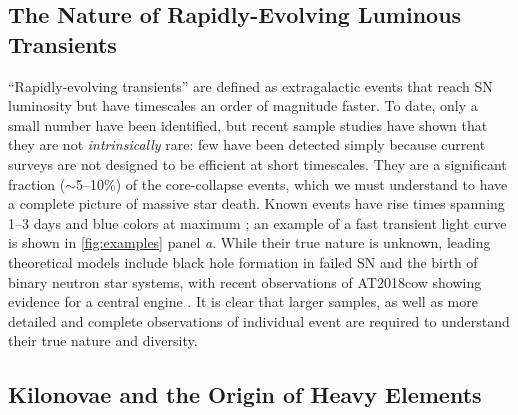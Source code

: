 \documentclass[letterpaper,longauthor,trackchanges,twocolumn,onecolappendix,sort&compress]{aastex62}
\begin{document}
\subsection{The Nature of Rapidly-Evolving Luminous Transients} 

``Rapidly-evolving transients'' are defined as extragalactic events that reach SN luminosity but have timescales an order of magnitude faster. To date, only a small number have been identified, but recent sample studies \citep{Drout2014} have shown that they are not \emph{intrinsically} rare: few have been detected simply because current surveys are not designed to be efficient at short timescales. They are a significant fraction ($\sim$5--10\%) of the core-collapse events, which we must understand to have a complete picture of massive star death. Known events have rise times spanning 1--3 days and blue colors at maximum \citep{Drout2014,Pirsiainen2018,Rest2018}; an example of a fast transient light curve is shown in \autoref{fig:examples} panel \emph{a}. While their true nature is unknown, leading theoretical models include black hole formation in failed SN and the birth of binary neutron star systems, with recent observations of AT2018cow showing evidence for a central engine \citep{Kashiyama2015,Prentice2018,Margutti2018}. 
It is clear that larger samples, as well as more detailed and complete observations of individual event are required to understand their true nature and diversity.


\subsection{Kilonovae and the Origin of Heavy Elements} 
\end{document}
